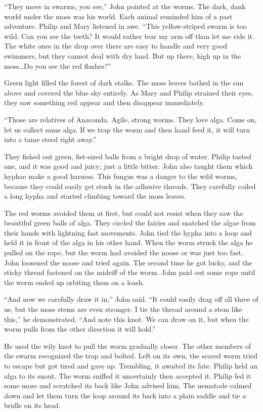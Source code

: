 \documentclass[10pt, draft]{memoir}
\begin{document}
``They move in swarms, you see,'' John pointed at the worms. The dark, dank
world under the moss was his world. Each animal reminded him of a past
adventure. Philip and Mary listened in awe. ``This yellow-striped swarm is too
wild. Can you see the teeth? It would rather tear my arm off than let me ride
it. The white ones in the drop over there are easy to handle and very good
swimmers, but they cannot deal with dry land. But up there, high up in the
moss\dots Do you see the red flashes?''

Green light filled the forest of dark stalks. The moss leaves bathed in the sun
above and covered the blue sky entirely. As Mary and Philip strained their
eyes, they saw something red appear and then disappear immediately.

``Those are relatives of Anaconda. Agile, strong worms. They love alga. Come
on, let us collect some alga. If we trap the worm and then hand feed it, it
will turn into a tame steed right away.''

They fished out green, fist-sized balls from a bright drop of water. Philip
tasted one, and it was good and juicy; just a little bitter. John also taught
them which hyphae make a good harness. This fungus was a danger to the wild
worms, because they could easily get stuck in the adhesive threads. They
carefully coiled a long hypha and started climbing toward the moss leaves.

The red worms avoided them at first, but could not resist when they saw the
beautiful green balls of alga. They circled the fairies and snatched the algae
from their hands with lightning fast movements. John tied the hypha into a loop
and held it in front of the alga in his other hand. When the worm struck the
alga he pulled on the rope, but the worm had avoided the noose or was just too
fast. John loosened the noose and tried again. The second time he got lucky,
and the sticky thread fastened on the midriff of the worm. John paid out some
rope until the worm ended up orbiting them on a leash.

``And now we carefully draw it in,'' John said. ``It could easily drag off all
three of us, but the moss stems are even stronger. I tie the thread around a
stem like this,'' he demonstrated. ``And note this knot. We can draw on it, but
when the worm pulls from the other direction it will hold.''

He used the wily knot to pull the worm gradually closer. The other members of
the swarm recognized the trap and bolted. Left on its own, the scared worm
tried to escape but got tired and gave up. Trembling, it awaited its fate.
Philip held an alga to its snout. The worm sniffed it uncertainly then accepted
it. Philip fed it some more and scratched its back like John advised him. The
nematode calmed down and let them turn the loop around its back into a plain
saddle and tie a bridle on its head.
\end{document}
